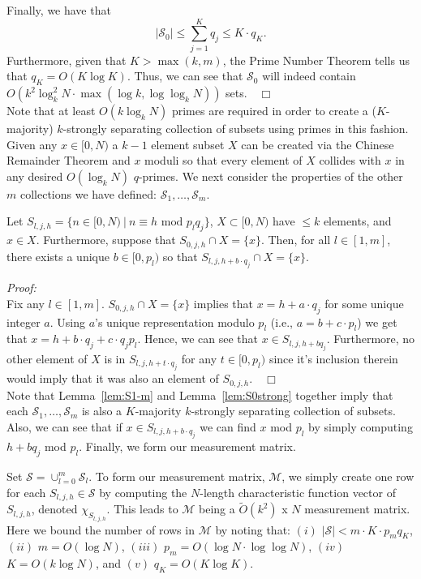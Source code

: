 \documentclass{article}
\begin{document}
Finally, we have that
$$| \mathcal{S}_{0} | \leq \sum^{K}_{j=1} q_{j} \leq K \cdot q_{K}.$$
Furthermore, given that $K > \max(k,m)$, the Prime Number Theorem tells us that $q_{K} = O(K \log K)$.  Thus, we can see that $\mathcal{S}_{0}$ will indeed contain $O\left(k^{2} \log^{2}_{k} N \cdot \max(\log k, \log \log_{k} N )\right)$ sets.~~$\Box$ \\

Note that at least $O(k\log_{k} N)$ primes are required in order to create a ($K$-majority) $k$-strongly separating collection of subsets using primes in this fashion.  Given any $x \in [0,N)$ a $k-1$ element subset $X$ can be created via the Chinese Remainder Theorem and $x$ moduli so that every element of $X$ collides with $x$ in any desired $O(\log_{k} N)$ $q$-primes.  We next consider the properties of the other $m$ collections we have defined:  $\mathcal{S}_{1}, \dots, \mathcal{S}_{m}$.

\begin{Lemma}
Let $S_{l,j,h} = \{ n \in [0,N)~|~n \equiv h \textrm{ mod } p_{l}q_{j} \}$, $X \subset [0,N)$ have $\leq k$ elements, and $x \in X$.  Furthermore, suppose that $S_{0,j,h} \cap X = \{ x \}$. Then, for all $l \in [1,m]$, there exists a unique $b \in [0,p_{l})$ so that $S_{l,j,h + b \cdot q_{j}} \cap X = \{ x \}$.
\label{lem:S1-m}
\end{Lemma}

\noindent \textit{Proof:}\\

Fix any $l \in [1,m]$.  $S_{0,j,h} \cap X = \{ x \}$ implies that $x = h + a \cdot q_{j}$ for some unique integer $a$.  Using $a$'s unique representation modulo $p_{l}$ (i.e., $a = b + c \cdot p_{l}$) we get that $x = h + b \cdot q_{j} + c \cdot q_{j} p_{l}$.  Hence, we can see that $x \in S_{l,j,h + bq_{j}}$.  Furthermore, no other element of $X$ is in $S_{l,j,h + t \cdot q_{j}}$ for any $t \in [0,p_{l})$ since it's inclusion therein would imply that it was also an element of $S_{0,j,h}$.~~$\Box$ \\

Note that Lemma~\ref{lem:S1-m} and Lemma~\ref{lem:S0strong} together imply that each $\mathcal{S}_{1}, \dots, \mathcal{S}_{m}$ is also a $K$-majority $k$-strongly separating collection of subsets.  Also, we can see that if $x \in S_{l,j,h + b \cdot q_{j}}$ we can find $x$ mod $p_{l}$ by simply computing $h + b q_{j}$ mod $p_{l}$.  Finally, we form our measurement matrix.

Set $\mathcal{S} = \cup^{m}_{l = 0} \mathcal{S}_{l}$.  To form our measurement matrix, $\mathcal{M}$, we simply create one row for each $S_{l,j,h} \in \mathcal{S}$ by computing the $N$-length characteristic function vector of $S_{l,j,h}$, denoted $\chi_{S_{l,j,h}}$.  This leads to $\mathcal{M}$ being a $\tilde{O}(k^{2})$ x $N$ measurement matrix.  Here we bound the number of rows in $\mathcal{M}$ by noting that: $(i)$ $| \mathcal{S} | < m \cdot K \cdot p_{m}q_{K}$, $(ii)$ $m = O(\log N)$, $(iii)$ $p_{m} = O(\log N \cdot \log\log N)$, $(iv)$ $K = O( k \log N)$, and $(v)$ $q_{K} = O(K \log K)$.
\end{document}
